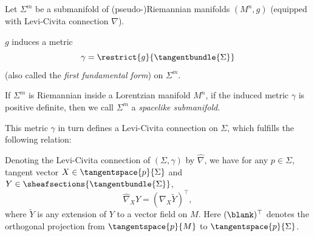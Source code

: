 \documentclass[titlepage,numbers=noenddot,headinclude,oneside,%
footinclude=true,cleardoublepage=empty,%
BCOR=5mm,paper=a4,fontsize=11pt,%
english,%
]{scrartcl}
\begin{document}
{ \newcommand{\Mconnection}{\nabla}\newcommand{\Sigmaconnection}{\hat{\nabla}}
Let \( \Sigma^m \) be a submanifold of (pseudo-)Riemannian manifolds \( (M^n,g) \) (equipped with Levi-Civita connection \( \Mconnection \)).
\begin{remark}
    \( g \) induces a metric
    \begin{equation}
        \gamma=\restrict{g}{\tangentbundle{\Sigma}}\label{eq:first_fundamental_form}
    \end{equation} 
    (also called the \emph{first fundamental form}) on \( \Sigma^m  \). 

    If \( \Sigma^m \) is Riemannian inside a Lorentzian manifold \( M^n \), \ie if the induced metric \( \gamma \) is positive definite, then we call \( \Sigma^m \) a \emph{spacelike submanifold}.\label{def:spacelike_hypersurface}
\end{remark}
This metric \( \gamma \) in turn defines a Levi-Civita connection on \( \Sigma \), which fulfills the following relation:
\begin{fact}
  Denoting the Levi-Civita connection of \( (\Sigma,\gamma) \) by \( \Sigmaconnection \), we have for any \( p\in \Sigma \), tangent vector \( X\in \tangentspace{p}{\Sigma} \) and \( Y\in \sheafsections{\tangentbundle{\Sigma}} \),
  \begin{equation*}
    \Sigmaconnection_X Y=(\Mconnection_X \tilde{Y})^\top,
  \end{equation*}
  where \( \tilde{Y} \) is any extension of \( Y \) to a vector field on \( M \). Here \( (\blank)^\top \) denotes the orthogonal projection from \( \tangentspace{p}{M} \) to \( \tangentspace{p}{\Sigma} \).


\end{fact}}
\end{document}
